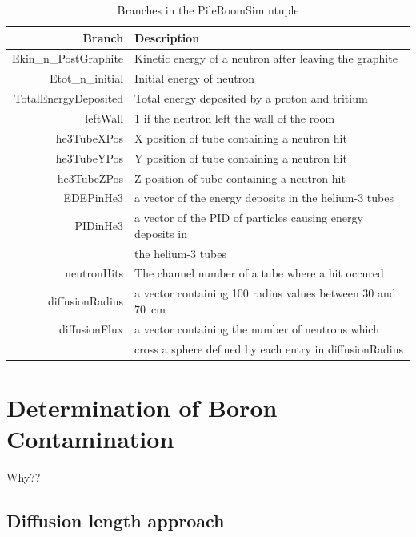 \documentclass{article}
\begin{document}
	
\begin{table}
	\centering
	\begin{tabular}{ rl }
		Branch	&	Description							\\	\hline	\hline
Ekin\_n\_PostGraphite	&	Kinetic energy of a neutron after leaving the graphite		\\		
Etot\_n\_initial	&	Initial energy of neutron					\\		
TotalEnergyDeposited	&	Total energy deposited by a proton and tritium			\\		
leftWall		&	1 if the neutron left the wall of the room			\\		
he3TubeXPos		&	X position of tube containing a neutron hit			\\		
he3TubeYPos		&	Y position of tube containing a neutron hit			\\		
he3TubeZPos		&	Z position of tube containing a neutron hit			\\		
EDEPinHe3		&	a vector of the energy deposits in the helium-3 tubes		\\		
PIDinHe3		&	a vector of the PID of particles causing energy deposits in 	\\		
			&	the helium-3 tubes						\\		
neutronHits		&	The channel number of a tube where a hit occured		\\		
diffusionRadius		&	a vector containing 100 radius values between 30 and 70~cm	\\		
diffusionFlux		&	a vector containing the number of neutrons which 		\\		
			&	cross a sphere defined by each entry in diffusionRadius		\\	\hline	

	
	\end{tabular}
	\caption{Branches in the PileRoomSim ntuple}
	\label{tab:branches}
\end{table}	




\section{Determination of Boron Contamination}

	Why??
\subsection{Diffusion length approach}
\end{document}
